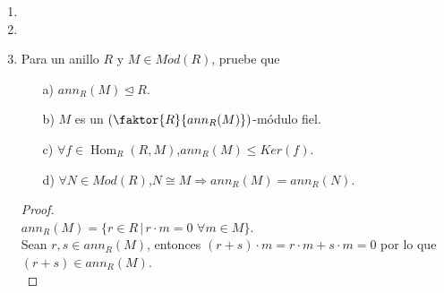 \documentclass{article}
\begin{document}
\begin{enumerate}[label=\textbf{Ej \arabic*.}]
\begin{proof}
 $\forall k\in \Z$, en particular si $m=ab$ con $a,b\neq 1$ entonces $a\,\faktor{\Z}{m\Z}=\faktor{\Z}{m\Z}$ 
y esto pasa sólo si $\left|\faktor{\Z}{m\Z}\right|=b<m$ lo cual
es una contradicción, por lo tanto $m$ debe ser primo. Si $m$ es primo $\faktor{\Z}{m\Z}$ es campo y por lo tanto simple.\\
\\
Sea $p$ primo y $n\geq 2$, entonces $\faktor{\Z}{p\Z}$ es simple en $\faktor{\Z}{p^n\Z}$, sin embrgo es el único simple, pues
si $M\leq \faktor{\Z}{p^n\Z}$ es simple, entonces $M=\faktor{\Z}{p^k\Z}$ y esto pasa sólo si $p^k$  es primo, es decir, si $k=1$.
Por lo tanto \\$Soc\left(\faktor{\Z}{p^n\Z}\right)=\faktor{\Z}{p\Z}$.\\
\\
Sea $n=p_1^{m_1}\ldots p_k^{m_k}$ su descomposición en primos.\\
Como $n\Z=p_1^{m_1}\ldots p_k^{m_k}\Z$ entonces $\faktor{\Z}{n\Z}=\faktor{\Z}{p_1^{m_1}\ldots p_k^{m_k}\Z}$, en particular 
$\faktor{\Z}{p_j\Z}\leq \faktor{\Z}{n\Z}$ es simple para toda $j\in \{1,\ldots , k\}$, pues $p_j\Z\geq n\Z$.\\
Por otra parte si $M$ es simple en $\faktor{\Z}{n\Z}$, entonces $M=\faktor{\Z}{p\Z}$ para algún $p$ primo y $p\Z\geq n\Z$, por lo que $p|n$
es decir, existe $j\in \{1,\ldots , k\}$ tal que $p|p_j^{m_j}$, entonces $p=p_j$ y así $M=\faktor{\Z}{p_j\Z}$ para algún  $j\in \{1,\ldots , k\}$.
Por lo tanto, como $p_j\Z\geq n\Z$ para toda $j\in \{1,\ldots , k\}$,
\[ Soc\left(\faktor{\Z}{n\Z}\right)\cong \displaystyle\sum_{i\leq k}
\faktor{\Z}{p_j\Z}=\displaystyle\bigoplus_{j\leq k}\faktor{\Z}{p_j\Z}\cong \faktor{\Z}{(p_1\ldots p_k)\Z}.\]
\end{proof}

\item
\item
\item Para un anillo $R$ y $M\in Mod(R)$, pruebe que 
\begin{itemize}
\item[a)] $ann_R(M)\unlhd R$.
\item[b)] $M$ es un $\left(\faktor{R}{ann_R(M)}\right)$-módulo fiel.
\item[c)] $\forall f\in \operatorname{Hom}_R(R,M)$,\quad $ann_R(M)\leq Ker(f)$.
\item[d)] $\forall N\in Mod(R)$,\quad $N\cong M\Longrightarrow ann_R(M)=ann_R(N)$.
\end{itemize}
\begin{proof}
\\
$ann_R(M)=\{r\in R\,|\,r\cdot m=0\,\,\forall m\in M\}$.\\
Sean $r,s\in ann_R(M)$, entonces $(r+s)\cdot m=r\cdot m+s\cdot m=0$ por lo que $(r+s)\in ann_R(M)$.\\


\end{proof}
\end{enumerate}
\end{document}
